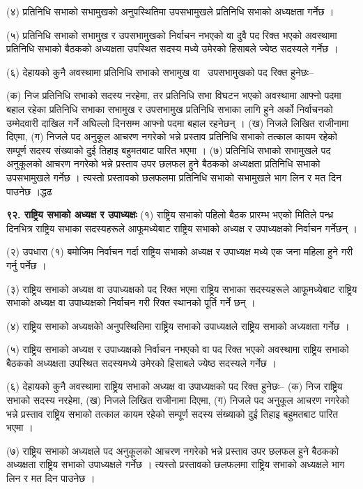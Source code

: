 (४) प्रतिनिधि सभाको सभामुखको अनुपस्थितिमा उपसभामुखले प्रतिनिधि सभाको अध्यक्षता गर्नेछ ।

(५) प्रतिनिधि सभाको सभामुख र उपसभामुखको निर्वाचन नभएको वा दुवै पद रिक्त भएको अवस्थामा प्रतिनिधि सभाको बैठकको अध्यक्षता उपस्थित सदस्य मध्ये उमेरको हिसाबले ज्येष्ठ सदस्यले गर्नेछ ।

(६) देहायको कुनै अवस्थामा प्रतिनिधि सभाको सभामुख वा  उपसभामुखको पद रिक्त हुनेछः–

(क) निज प्रतिनिधि सभाको सदस्य नरहेमा, तर प्रतिनिधि सभा विघटन भएको अवस्थामा आफ्नो पदमा बहाल रहेका प्रतिनिधि सभाका सभामुख र उपसभामुख प्रतिनिधि सभाका लागि हुने अर्को निर्वाचनको उम्मेदवारी दाखिल गर्ने अघिल्लो दिनसम्म आफ्नो पदमा बहाल रहनेछन् ।
(ख) निजले लिखित राजीनामा दिएमा,
(ग) निजले पद अनुकूल आचरण नगरेको भन्ने प्रस्ताव प्रतिनिधि सभाको तत्काल कायम रहेको सम्पूर्ण सदस्य संख्याको दुई तिहाइ बहुमतबाट पारित भएमा ।
(७) प्रतिनिधि सभाको सभामुखले पद अनुकूलको आचरण नगरेको भन्ने प्रस्ताव उपर छलफल हुने बैठकको अध्यक्षता प्रतिनिधि सभाको उपसभामुखले गर्नेछ । त्यस्तो प्रस्तावको छलफलमा प्रतिनिधि सभाको सभामुखले भाग लिन र मत दिन पाउनेछ ।द्धढ

\textbf{९२. राष्ट्रिय सभाको अध्यक्ष र उपाध्यक्षः} (१) राष्ट्रिय सभाको पहिलो बैठक प्रारम्भ भएको मितिले पन्ध्र दिनभित्र राष्ट्रिय सभाका सदस्यहरूले आफूमध्येबाट राष्ट्रिय सभाको अध्यक्ष र उपाध्यक्षको निर्वाचन गर्नेछन् ।

(२) उपधारा (१) बमोजिम निर्वाचन गर्दा राष्ट्रिय सभाको अध्यक्ष र उपाध्यक्ष मध्ये एक जना महिला हुने गरी गर्नु पर्नेछ ।

(३) राष्ट्रिय सभाको अध्यक्ष वा उपाध्यक्षको पद रिक्त भएमा राष्ट्रिय सभाका सदस्यहरूले आफूमध्येबाट राष्ट्रिय सभाको अध्यक्ष वा उपाध्यक्षको निर्वाचन गरी रिक्त स्थानको पूर्ति गर्ने छन् ।

(४) राष्ट्रिय सभाको अध्यक्षकोे अनुपस्थितिमा राष्ट्रिय सभाको उपाध्यक्षले राष्ट्रिय सभाको अध्यक्षता गर्नेछ ।

(५) राष्ट्रिय सभाको अध्यक्ष र उपाध्यक्षको निर्वाचन नभएको वा पद रिक्त भएको अवस्थामा राष्ट्रिय सभाको बैठकको अध्यक्षता उपस्थित
सदस्यमध्ये उमेरको हिसाबले ज्येष्ठ सदस्यले गर्नेछ ।

(६) देहायको कुनै अवस्थामा राष्ट्रिय सभाको अध्यक्ष वा उपाध्यक्षको पद रिक्त हुनेछः–
(क) निज राष्ट्रिय सभाको सदस्य नरहेमा,
(ख) निजले लिखित राजीनामा दिएमा,
(ग) निजले पद अनुकूल आचरण नगरेको भन्ने प्रस्ताव राष्ट्रिय सभाको तत्काल कायम रहेको सम्पूर्ण सदस्य संख्याको दुई तिहाइ बहुमतबाट पारित भएमा ।

(७) राष्ट्रिय सभाको अध्यक्षले पद अनुकूलको आचरण नगरेको भन्ने प्रस्ताव उपर छलफल हुने बैठकको अध्यक्षता राष्ट्रिय सभाको उपाध्यक्षले गर्नेछ । त्यस्तो प्रस्तावको छलफलमा राष्ट्रिय सभाको अध्यक्षले भाग लिन र मत दिन पाउनेछ ।

